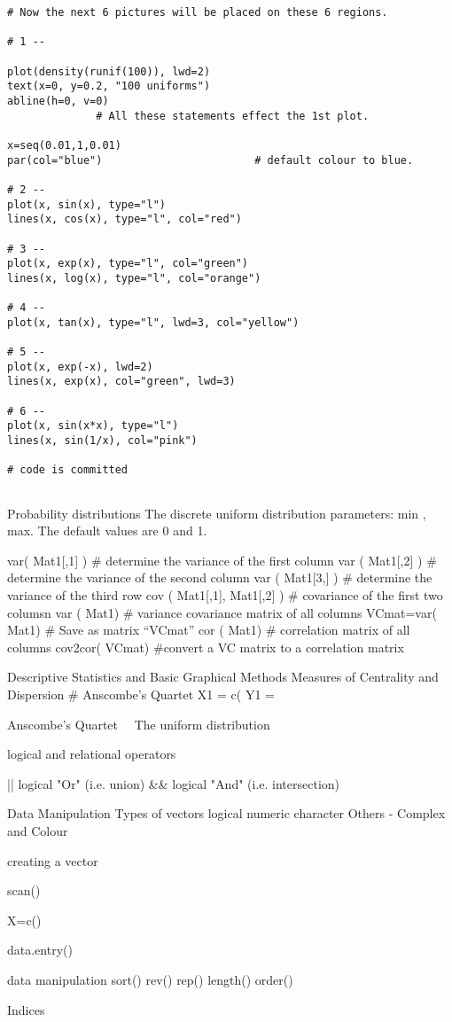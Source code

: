 \begin{verbatim}
# Now the next 6 pictures will be placed on these 6 regions. 

# 1 --

plot(density(runif(100)), lwd=2)
text(x=0, y=0.2, "100 uniforms")        
abline(h=0, v=0)
	          # All these statements effect the 1st plot.

x=seq(0.01,1,0.01)
par(col="blue")                        # default colour to blue.

# 2 --
plot(x, sin(x), type="l")
lines(x, cos(x), type="l", col="red")

# 3 --
plot(x, exp(x), type="l", col="green")
lines(x, log(x), type="l", col="orange")

# 4 --
plot(x, tan(x), type="l", lwd=3, col="yellow")

# 5 --
plot(x, exp(-x), lwd=2)
lines(x, exp(x), col="green", lwd=3)

# 6 --
plot(x, sin(x*x), type="l")
lines(x, sin(1/x), col="pink")

# code is committed
 
\end{verbatim}

 
Probability distributions
The discrete uniform distribution
parameters: min , max.
The default values are 0 and 1.
 



var( Mat1[,1] )			# determine the variance of the first column 
var ( Mat1[,2] )			# determine the variance of the second column
var ( Mat1[3,] )			# determine the variance of the third row
cov ( Mat1[,1], Mat1[,2] )	# covariance of the first two columsn
var ( Mat1)			# variance covariance matrix of all columns
VCmat=var( Mat1)		# Save as matrix “VCmat”
cor ( Mat1)			# correlation matrix of all columns
cov2cor( VCmat)		#convert a VC matrix to a correlation matrix

 
Descriptive Statistics and Basic Graphical Methods
Measures of Centrality and Dispersion
# Anscombe’s  Quartet
X1 = c(
Y1 =
 

Anscombe’s Quartet 
The uniform distribution





logical and relational operators
 
||      logical "Or"      (i.e.  union)
&&     logical "And"   (i.e. intersection)   

 



Data Manipulation
Types of vectors
	logical
	numeric
	character
    Others  - Complex and Colour

creating a vector

scan()

X=c()

data.entry()

data manipulation
sort()
rev()
rep()
length()
order()


Indices

 
